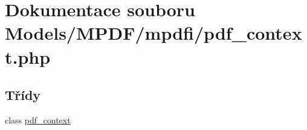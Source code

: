 \hypertarget{pdf__context_8php}{\section{Dokumentace souboru Models/\-M\-P\-D\-F/mpdfi/pdf\-\_\-context.php}
\label{pdf__context_8php}
}
\subsection*{Třídy}
\begin{DoxyCompactItemize}
\item 
class \hyperlink{classpdf__context}{pdf\-\_\-context}
\end{DoxyCompactItemize}
